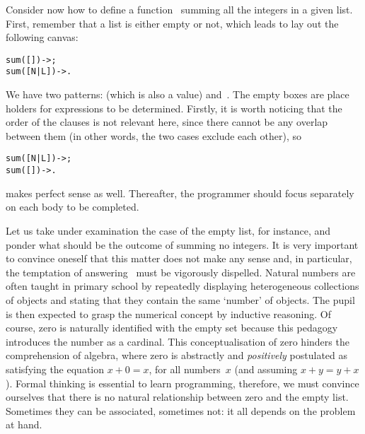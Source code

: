 Consider now how to define a function~ summing all the
integers in a given list. First, remember that a list is either empty
or not, which leads to lay out the following canvas:
\begin{alltt}
sum(   []) -> ;
sum([N|L]) -> .
\end{alltt}
\noindent We have two patterns: \erlcode{[]} (which is also a value)
and~\erlcode{[N|L]}. The empty boxes are place holders for \Erlang
expressions to be determined. Firstly, it is worth noticing that the
order of the clauses is not relevant here, since there cannot be any
overlap between them (in other words, the two cases exclude each
other), so
\begin{alltt}
sum([N|L]) -> ;
sum(   []) -> .
\end{alltt}
\noindent makes perfect sense as well. Thereafter, the programmer
should focus separately on each body to be completed.

Let us take under examination the case of the empty list, for
instance, and ponder what should be the outcome of summing no
integers. It is very important to convince oneself that this matter
does not make any sense and, in particular, the temptation of
answering~ must be vigorously dispelled. Natural numbers
are often taught in primary school by repeatedly displaying
heterogeneous collections of objects and stating that they contain the
same `number' of objects. The pupil is then expected to grasp the
numerical concept by inductive reasoning. Of course, zero is naturally
identified with the empty set because this pedagogy introduces the
number as a cardinal. This conceptualisation of zero hinders the
comprehension of algebra, where zero is abstractly and
\emph{positively} postulated as satisfying the equation \(x + 0 = x\),
for all numbers~\(x\) (and assuming \(x + y = y + x\)). Formal
thinking is essential to learn programming, therefore, we must
convince ourselves that there is no natural relationship between zero
and the empty list. Sometimes they can be associated, sometimes not:
it all depends on the problem at hand.

